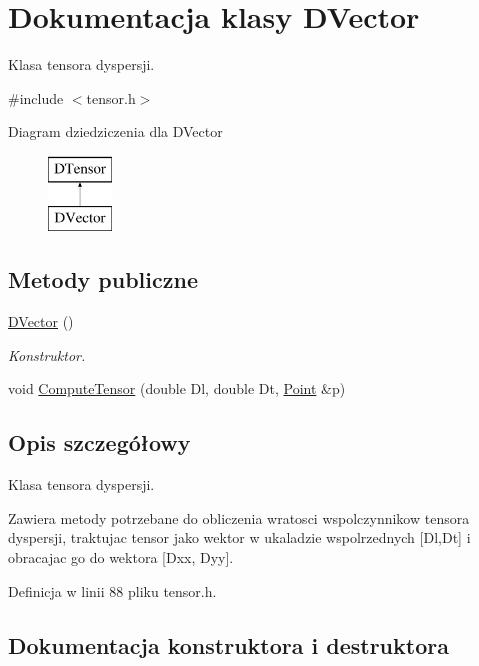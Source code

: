 \hypertarget{class_d_vector}{}\section{Dokumentacja klasy D\+Vector}
\label{class_d_vector}


Klasa tensora dyspersji.  




{\ttfamily \#include $<$tensor.\+h$>$}

Diagram dziedziczenia dla D\+Vector\begin{figure}[H]
\begin{center}
\leavevmode
\includegraphics[height=2.000000cm]{class_d_vector}
\end{center}
\end{figure}
\subsection*{Metody publiczne}
\begin{DoxyCompactItemize}
\item 
\hyperlink{class_d_vector_a8acb7f030a2049c718f79d265da12e62}{D\+Vector} ()
\begin{DoxyCompactList}\small\item\em Konstruktor. \end{DoxyCompactList}\item 
void \hyperlink{class_d_vector_a2069ef34d3db2a9965f07e27f17e12dd}{Compute\+Tensor} (double Dl, double Dt, \hyperlink{class_point}{Point} \&p)
\end{DoxyCompactItemize}


\subsection{Opis szczegółowy}
Klasa tensora dyspersji. 

Zawiera metody potrzebane do obliczenia wratosci wspolczynnikow tensora dyspersji, traktujac tensor jako wektor w ukaladzie wspolrzednych \mbox{[}Dl,Dt\mbox{]} i obracajac go do wektora \mbox{[}Dxx, Dyy\mbox{]}. 

Definicja w linii 88 pliku tensor.\+h.



\subsection{Dokumentacja konstruktora i destruktora}
\hypertarget{class_d_vector_a8acb7f030a2049c718f79d265da12e62}{}
